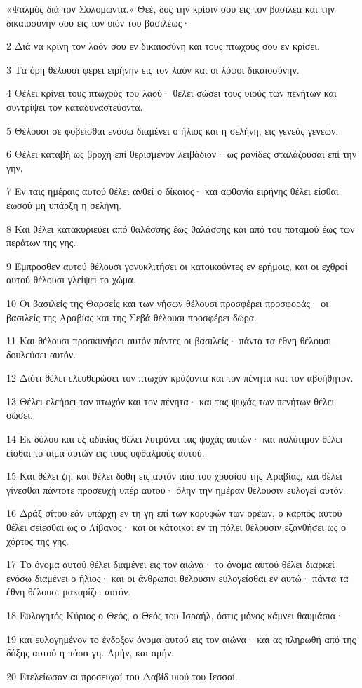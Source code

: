 \par «Ψαλμός διά τον Σολομώντα.» Θεέ, δος την κρίσιν σου εις τον βασιλέα και την δικαιοσύνην σου εις τον υιόν του βασιλέως·
\par 2 Διά να κρίνη τον λαόν σου εν δικαιοσύνη και τους πτωχούς σου εν κρίσει.
\par 3 Τα όρη θέλουσι φέρει ειρήνην εις τον λαόν και οι λόφοι δικαιοσύνην.
\par 4 Θέλει κρίνει τους πτωχούς του λαού· θέλει σώσει τους υιούς των πενήτων και συντρίψει τον καταδυναστεύοντα.
\par 5 Θέλουσι σε φοβείσθαι ενόσω διαμένει ο ήλιος και η σελήνη, εις γενεάς γενεών.
\par 6 Θέλει καταβή ως βροχή επί θερισμένον λειβάδιον· ως ρανίδες σταλάζουσαι επί την γην.
\par 7 Εν ταις ημέραις αυτού θέλει ανθεί ο δίκαιος· και αφθονία ειρήνης θέλει είσθαι εωσού μη υπάρξη η σελήνη.
\par 8 Και θέλει κατακυριεύει από θαλάσσης έως θαλάσσης και από του ποταμού έως των περάτων της γης.
\par 9 Έμπροσθεν αυτού θέλουσι γονυκλιτήσει οι κατοικούντες εν ερήμοις, και οι εχθροί αυτού θέλουσι γλείψει το χώμα.
\par 10 Οι βασιλείς της Θαρσείς και των νήσων θέλουσι προσφέρει προσφοράς· οι βασιλείς της Αραβίας και της Σεβά θέλουσι προσφέρει δώρα.
\par 11 Και θέλουσι προσκυνήσει αυτόν πάντες οι βασιλείς· πάντα τα έθνη θέλουσι δουλεύσει αυτόν.
\par 12 Διότι θέλει ελευθερώσει τον πτωχόν κράζοντα και τον πένητα και τον αβοήθητον.
\par 13 Θέλει ελεήσει τον πτωχόν και τον πένητα· και τας ψυχάς των πενήτων θέλει σώσει.
\par 14 Εκ δόλου και εξ αδικίας θέλει λυτρόνει τας ψυχάς αυτών· και πολύτιμον θέλει είσθαι το αίμα αυτών εις τους οφθαλμούς αυτού.
\par 15 Και θέλει ζη, και θέλει δοθή εις αυτόν από του χρυσίου της Αραβίας, και θέλει γίνεσθαι πάντοτε προσευχή υπέρ αυτού· όλην την ημέραν θέλουσιν ευλογεί αυτόν.
\par 16 Δράξ σίτου εάν υπάρχη εν τη γη επί των κορυφών των ορέων, ο καρπός αυτού θέλει σείεσθαι ως ο Λίβανος· και οι κάτοικοι εν τη πόλει θέλουσιν εξανθήσει ως ο χόρτος της γης.
\par 17 Το όνομα αυτού θέλει διαμένει εις τον αιώνα· το όνομα αυτού θέλει διαρκεί ενόσω διαμένει ο ήλιος· και οι άνθρωποι θέλουσιν ευλογείσθαι εν αυτώ· πάντα τα έθνη θέλουσι μακαρίζει αυτόν.
\par 18 Ευλογητός Κύριος ο Θεός, ο Θεός του Ισραήλ, όστις μόνος κάμνει θαυμάσια·
\par 19 και ευλογημένον το ένδοξον όνομα αυτού εις τον αιώνα· και ας πληρωθή από της δόξης αυτού η πάσα γη. Αμήν, και αμήν.
\par 20 Ετελείωσαν αι προσευχαί του Δαβίδ υιού του Ιεσσαί.

